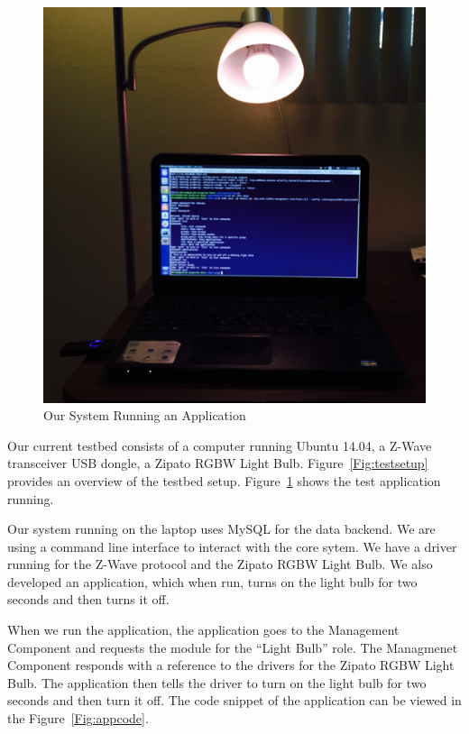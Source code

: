 \begin{figure}[tbh]                                                              
    \centering                                                                   
    \includegraphics[width=1.0\columnwidth]{figs/workingtest.jpg}                 
    \caption{Our System Running an Application}                                                       
    \label{Fig:runapp}                                                             
\end{figure} 
Our current testbed consists of a computer running Ubuntu 14.04, a Z-Wave
transceiver USB dongle, a Zipato RGBW Light Bulb. Figure~\ref{Fig:testsetup}
provides an overview of the testbed setup. Figure~\ref{Fig:runapp} shows the
test application running.

Our system running on the laptop uses MySQL for the data backend. We are using
a command line interface to interact with the core sytem. We have a driver
running for the Z-Wave protocol and the Zipato RGBW Light Bulb. We also
developed an application, which when run, turns on the light bulb for two
seconds and then turns it off. 

When we run the application, the application goes to the Management Component
and requests the module for the ``Light Bulb'' role. The Managmenet Component
responds with a reference to the drivers for the Zipato RGBW Light Bulb. The
application then tells the driver to turn on the light bulb for two seconds and
then turn it off. The code snippet of the application can be viewed in the
Figure~\ref{Fig:appcode}.

